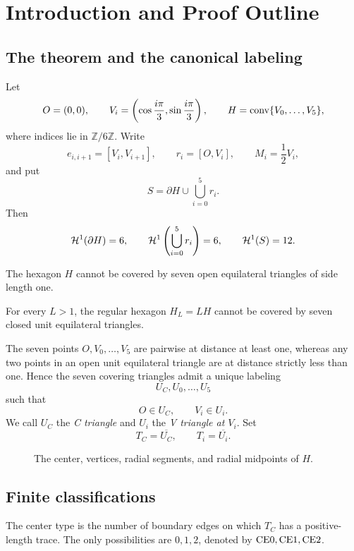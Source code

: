 \section{Introduction and Proof Outline}
\label{sec:introduction}

\subsection{The theorem and the canonical labeling}

Let
\[
 O=(0,0),\qquad
 V_i=\left(\cos\frac{i\pi}{3},\sin\frac{i\pi}{3}\right),\qquad
 H=\mathrm{conv}\{V_0,\ldots,V_5\},
\]
where indices lie in $\mathbb Z/6\mathbb Z$.  Write
\[
 e_{i,i+1}=[V_i,V_{i+1}],\qquad r_i=[O,V_i],\qquad M_i=\frac12V_i,
\]
and put
\[
 S=\partial H\cup\bigcup_{i=0}^5r_i.
\]
Then
\[
 \mathcal H^1(\partial H)=6,
 \qquad
 \mathcal H^1\left(\bigcup_{i=0}^5r_i\right)=6,
 \qquad
 \mathcal H^1(S)=12.
\]

\begin{theorem}
\label{thm:main}
The hexagon $H$ cannot be covered by seven open equilateral triangles of side
length one.
\end{theorem}

\begin{corollary}
\label{cor:expanded-closed}
For every $L>1$, the regular hexagon $H_L=LH$ cannot be covered by seven closed
unit equilateral triangles.
\end{corollary}

The seven points $O,V_0,\ldots,V_5$ are pairwise at distance at least one,
whereas any two points in an open unit equilateral triangle are at distance
strictly less than one.  Hence the seven covering triangles admit a unique
labeling
\[
 U_C,U_0,\ldots,U_5
\]
such that
\[
 O\in U_C,
 \qquad
 V_i\in U_i.
\]
We call $U_C$ the \emph{C triangle} and $U_i$ the \emph{V triangle at
$V_i$}.  Set
\[
 T_C=\overline{U_C},\qquad T_i=\overline{U_i}.
\]

\begin{figure}[H]
\centering

\caption{The center, vertices, radial segments, and radial midpoints of $H$.}
\label{fig:geometry-roles}
\end{figure}

\subsection{Finite classifications}

The center type is the number of boundary edges on which $T_C$ has a
positive-length trace.  The only possibilities are $0,1,2$, denoted by
$\mathrm{CE0},\mathrm{CE1},\mathrm{CE2}$.

